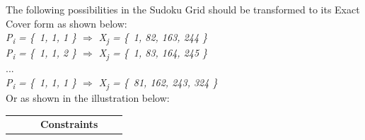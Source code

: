 \documentclass[a4paper,oneside,11pt]{report}
\newcounter{row}
\begin{document}
\noindent The following possibilities in the Sudoku Grid should be transformed to its Exact Cover form as shown below:\\
{\itshape P\textsubscript{i} = \{\ 1, 1, 1 \} $\Rightarrow$ X\textsubscript{j} = \{\ 1, 82, 163, 244 \}}\\
{\itshape P\textsubscript{i} = \{\ 1, 1, 2 \} $\Rightarrow$ X\textsubscript{j} = \{\ 1, 83, 164, 245 \}}\\
...\\
{\itshape P\textsubscript{i} = \{\ 1, 1, 1 \} $\Rightarrow$ X\textsubscript{j} = \{\ 81, 162, 243, 324 \}}\\
\newline
Or as shown in the illustration below:
\begin{center}
\begin{tabular}{m{0.2cm} m{2.5cm} m{2.9cm} m{3cm} m{3cm} m{2.5cm}}
& & & \textbf{Constraints} & &
\end{tabular}
\end{center} 
\end{document}
